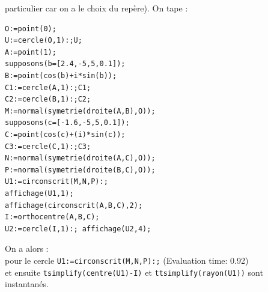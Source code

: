 \documentclass[a4paper,11pt]{book}
\begin{document}
particulier car on a le choix du rep\`ere). 
On tape :
\begin{verbatim}
O:=point(0);
U:=cercle(O,1):;U;
A:=point(1);
supposons(b=[2.4,-5,5,0.1]);
B:=point(cos(b)+i*sin(b));
C1:=cercle(A,1):;C1;
C2:=cercle(B,1):;C2;
M:=normal(symetrie(droite(A,B),O));
supposons(c=[-1.6,-5,5,0.1]);
C:=point(cos(c)+(i)*sin(c));
C3:=cercle(C,1):;C3;
N:=normal(symetrie(droite(A,C),O));
P:=normal(symetrie(droite(B,C),O));
U1:=circonscrit(M,N,P):;
affichage(U1,1);
affichage(circonscrit(A,B,C),2);
I:=orthocentre(A,B,C);
U2:=cercle(I,1):; affichage(U2,4);
\end{verbatim}
On a alors :\\
pour le cercle {\tt U1:=circonscrit(M,N,P):;} (Evaluation time: 0.92)\\
et ensuite {\tt tsimplify(centre(U1)-I)} et  {\tt ttsimplify(rayon(U1))} sont
instantan\'es.
\end{document}
